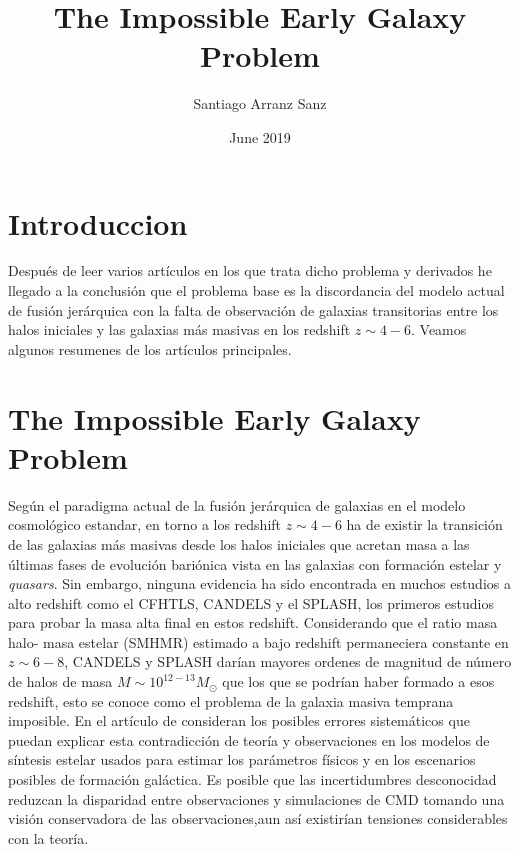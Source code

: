\documentclass{article}
\title{The Impossible  Early Galaxy Problem}
\author{Santiago Arranz Sanz }
\date{June 2019}
\begin{document}
\maketitle

\section*{Introduccion}

Después de leer varios artículos en los que trata dicho problema y derivados he llegado a la conclusión que el problema base es la discordancia del modelo actual de fusión jerárquica con la falta de observación de galaxias transitorias entre los halos iniciales y las galaxias más masivas en los redshift $z\sim 4-6$. Veamos algunos resumenes de los artículos principales.

\section*{The Impossible Early Galaxy Problem}
\citep{steinhardt2016impossibly} Según el paradigma actual de la fusión jerárquica de galaxias en el modelo cosmológico estandar, en torno a los redshift $z\sim 4-6$ ha de existir la transición de las galaxias más masivas desde los halos iniciales que acretan masa a las últimas fases de evolución bariónica vista en las galaxias con formación estelar y \textit{quasars}. Sin embargo, ninguna evidencia ha sido encontrada en muchos estudios a alto redshift como el CFHTLS, CANDELS y el SPLASH, los primeros estudios para probar la masa alta final en estos redshift. Considerando que el ratio masa halo- masa estelar (SMHMR) estimado a bajo redshift permaneciera constante en $z\sim 6-8$, CANDELS y SPLASH darían mayores ordenes de magnitud de número de halos de masa $M\sim 10^{12-13}M_\odot$ que los que se podrían haber formado a esos redshift, esto se conoce como el problema de la galaxia masiva temprana imposible. En el artículo de \cite{steinhardt2016impossibly} consideran los posibles errores sistemáticos que puedan explicar esta contradicción de teoría y observaciones en los modelos de síntesis estelar usados para estimar los parámetros físicos  y en los escenarios posibles de formación galáctica. Es posible que las incertidumbres desconocidad reduzcan la disparidad entre observaciones y simulaciones de CMD tomando una visión conservadora de las observaciones,aun así existirían tensiones considerables con la teoría.\\
\end{document}
